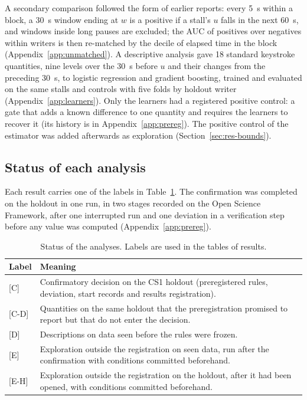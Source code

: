 A secondary comparison followed the form of earlier reports: every 5~s within a block, a 30~s window ending at $w$ is a
positive if a stall's $u$ falls in the next 60~s, and windows inside long pauses are excluded; the AUC of positives over
negatives within writers is then re-matched by the decile of elapsed time in the block (Appendix~\ref{app:unmatched}).
A descriptive analysis gave 18 standard keystroke quantities, nine levels over the 30~s before $u$ and their changes from
the preceding 30~s, to logistic regression and gradient boosting, trained and evaluated on the same stalls and controls
with five folds by holdout writer (Appendix~\ref{app:learners}). Only the learners had a registered positive control: a gate that adds a known difference to one quantity and requires
the learners to recover it (its history is in Appendix~\ref{app:prereg}). The positive control of the estimator was
added afterwards as exploration (Section~\ref{sec:res-bounds}).

\subsection{Status of each analysis}

Each result carries one of the labels in Table~\ref{tab:status}. The confirmation was completed on the holdout in one run, in two
stages recorded on the Open Science Framework, after one interrupted run and one deviation in a verification step
before any value was computed (Appendix~\ref{app:prereg}).

\begin{table}
  \caption{Status of the analyses. Labels are used in the tables of results.}
  \label{tab:status}
  \centering\small
  \begin{tabularx}{\linewidth}{l >{\raggedright\arraybackslash}X}
    \toprule
    Label & Meaning \\
    \midrule
    {[C]} & Confirmatory decision on the CS1 holdout (preregistered rules, deviation, start records and results
    registration). \\
    {[C-D]} & Quantities on the same holdout that the preregistration promised to report but that do not enter the
    decision. \\
    {[D]} & Descriptions on data seen before the rules were frozen. \\
    {[E]} & Exploration outside the registration on seen data, run after the confirmation with conditions committed
    beforehand. \\
    {[E-H]} & Exploration outside the registration on the holdout, after it had been opened, with conditions committed
    beforehand. \\
    \bottomrule
  \end{tabularx}
\end{table}
